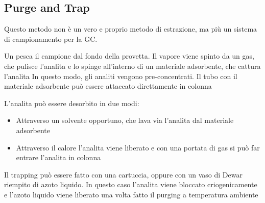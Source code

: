 \subsection{Purge and Trap}
Questo metodo non è un vero e proprio metodo di estrazione, ma più un sistema di campionamento per la GC.

Un pesca il campione dal fondo della provetta. Il vapore viene spinto da un gas, che pulisce l'analita e lo spinge all'interno di un materiale adsorbente, che cattura l'analita
In questo modo, gli analiti vengono pre-concentrati. Il tubo con il materiale adsorbente può essere attaccato direttamente in colonna


L'analita può essere desorbito in due modi:
\begin{itemize}
\item Attraverso un solvente opportuno, che lava via l'analita dal materiale adsorbente
\item Attraverso il calore l'analita viene liberato e con una portata di gas si può far entrare l'analita in colonna
\end{itemize}

Il trapping può essere fatto con una cartuccia, oppure con un vaso di Dewar riempito di azoto liquido.
In questo caso l'analita viene bloccato criogenicamente e l'azoto liquido viene liberato una volta fatto il purging a temperatura ambiente
